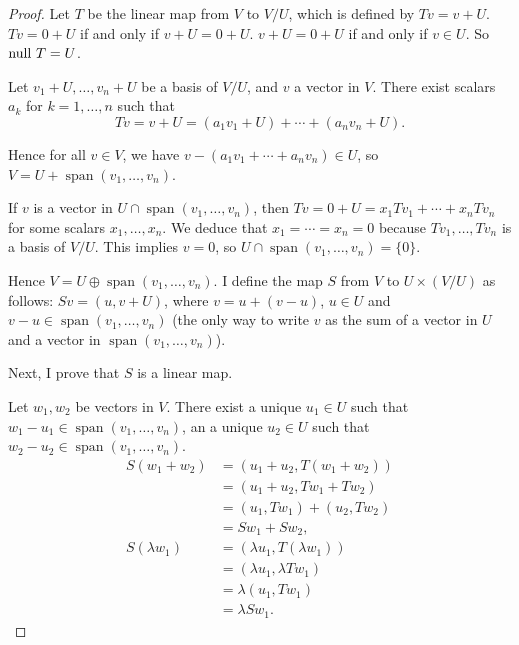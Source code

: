 \begin{proof}
    Let $T$ be the linear map from $V$ to $V/U$, which is defined by $Tv = v + U$. $Tv = 0 + U$ if and only if $v + U = 0 + U$. $v + U = 0 + U$ if and only if $v\in U$. So $\operatorname{null}\,{T} = U$.

    Let $v_{1} + U, \ldots, v_{n} + U$ be a basis of $V/U$, and $v$ a vector in $V$. There exist scalars $a_{k}$ for $k = 1,\ldots, n$ such that
    \[
        Tv = v + U = (a_{1}v_{1} + U) + \cdots + (a_{n}v_{n} + U).
    \]

    Hence for all $v\in V$, we have $v - (a_{1}v_{1} + \cdots + a_{n}v_{n})\in U$, so $V = U + \operatorname{span}(v_{1}, \ldots, v_{n})$.

    If $v$ is a vector in $U \cap \operatorname{span}(v_{1}, \ldots, v_{n})$, then $Tv = 0 + U = x_{1}Tv_{1} + \cdots + x_{n}Tv_{n}$ for some scalars $x_{1}, \ldots, x_{n}$. We deduce that $x_{1} = \cdots = x_{n} = 0$ because $Tv_{1}, \ldots, Tv_{n}$ is a basis of $V/U$. This implies $v = 0$, so $U \cap \operatorname{span}(v_{1}, \ldots, v_{n}) = \{0\}$.

    Hence $V = U \oplus \operatorname{span}(v_{1}, \ldots, v_{n})$. I define the map $S$ from $V$ to $U\times (V/U)$ as follows: $Sv = (u, v + U)$, where $v = u + (v - u)$, $u\in U$ and $v - u\in \operatorname{span}(v_{1}, \ldots, v_{n})$ (the only way to write $v$ as the sum of a vector in $U$ and a vector in $\operatorname{span}(v_{1}, \ldots, v_{n})$).

    Next, I prove that $S$ is a linear map.

    Let $w_{1}, w_{2}$ be vectors in $V$. There exist a unique $u_{1}\in U$ such that $w_{1} - u_{1}\in \operatorname{span}(v_{1}, \ldots, v_{n})$, an a unique $u_{2}\in U$ such that $w_{2} - u_{2}\in \operatorname{span}(v_{1}, \ldots, v_{n})$.
    \begin{align*}
        S(w_{1} + w_{2}) & = (u_{1} + u_{2}, T(w_{1} + w_{2})) \\
                         & = (u_{1} + u_{2}, Tw_{1} + Tw_{2})  \\
                         & = (u_{1}, Tw_{1}) + (u_{2}, Tw_{2}) \\
                         & = Sw_{1} + Sw_{2},                  \\
        S(\lambda w_{1}) & = (\lambda u_{1}, T(\lambda w_{1})) \\
                         & = (\lambda u_{1}, \lambda Tw_{1})   \\
                         & = \lambda (u_{1}, Tw_{1})           \\
                         & = \lambda Sw_{1}.
    \end{align*}


\end{proof}
